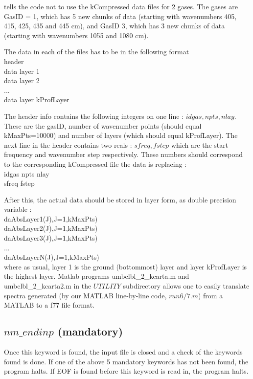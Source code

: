 \documentclass[12pt]{article}
\newcommand{\cm}{\hbox{cm}}
\newcommand{\ttab}{\indent\indent}
\begin{document}
{{tells the code not to use the kCompressed data files for 2 gases. The gases
are GasID = 1, which has 5 new chunks of data (starting with wavenumbers 405, 
415, 425, 435 and 445 \cm), and GasID 3, which has 3 new chunks of data 
(starting with wavenumbers 1055 and 1080 \cm).

The data in each of the files has to be in the following format\\
\medskip
{\sf 
\ttab header\\
\ttab data layer 1\\
\ttab data layer 2\\
\ttab ...\\
\ttab data layer kProfLayer\\
\ttab }

The header info contains the following integers on one line : 
$idgas,npts,nlay$. These are the gasID, number of wavenumber points (should 
equal kMaxPts=10000) and number of layers (which should equal kProfLayer). 
The next line in the header contains two reals : $sfreq, fstep$ which are the 
start frequency and  wavenumber step respectively. These numbers should 
correspond to the corresponding kCompressed file the data is replacing :\\
\medskip
{\sf 
\ttab idgas npts nlay\\
\ttab sfreq fstep\\
\ttab }

After this, the actual data should be stored in layer form, as double 
precision variable : \\
\medskip
{\sf 
\ttab daAbsLayer1(J),J=1,kMaxPts)\\
\ttab daAbsLayer2(J),J=1,kMaxPts)\\
\ttab daAbsLayer3(J),J=1,kMaxPts)\\
\ttab ...\\
\ttab daAbsLayerN(J),J=1,kMaxPts)\\
\ttab }
where as usual, layer 1 is the ground (bottommost) layer and layer kProfLayer
is the highest layer. Matlab programs  umbclbl\_2\_kcarta.m and 
umbclbl\_2\_kcarta2.m in the $UTILITY$ subdirectory allows one to easily 
translate spectra generated (by our MATLAB
line-by-line code, $run6/7.m$) from a MATLAB to a f77 file format.

\subsection{$nm\_endinp$ (mandatory)}

Once this keyword is found, the input file is closed and a check of the 
keywords found is done.  If one of the above 5 mandatory keywords has not
been found, the program halts.  If EOF is found before this keyword is read 
in, the program halts.

}}
\end{document}

